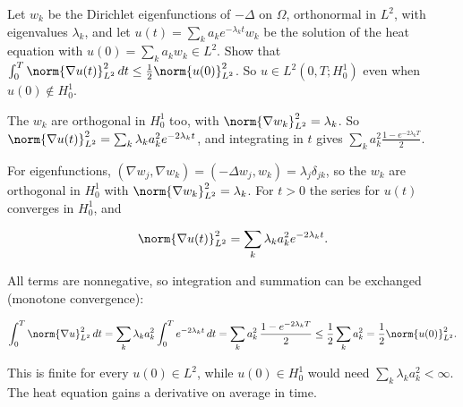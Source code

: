 \begin{exercise}
  Let $w_k$ be the Dirichlet eigenfunctions of $-\Delta$ on $\Omega$, orthonormal in $L^2$, with eigenvalues $\lambda_k$, and let $u(t) = \sum_k a_k e^{-\lambda_k t} w_k$ be the solution of the heat equation with $u(0) = \sum_k a_k w_k \in L^2$. Show that $\int_0^T \norm{\nabla u(t)}_{L^2}^2\,dt \le \frac12\norm{u(0)}_{L^2}^2$. So $u \in L^2(0,T;H^1_0)$ even when $u(0) \notin H^1_0$.
  \begin{hint}
    The $w_k$ are orthogonal in $H^1_0$ too, with $\norm{\nabla w_k}_{L^2}^2 = \lambda_k$. So $\norm{\nabla u(t)}_{L^2}^2 = \sum_k \lambda_k a_k^2 e^{-2\lambda_k t}$, and integrating in $t$ gives $\sum_k a_k^2 \frac{1 - e^{-2\lambda_k T}}{2}$.
  \end{hint}
  \begin{solution}
    For eigenfunctions, $(\nabla w_j, \nabla w_k) = (-\Delta w_j, w_k) = \lambda_j\delta_{jk}$, so the $w_k$ are orthogonal in $H^1_0$ with $\norm{\nabla w_k}_{L^2}^2 = \lambda_k$. For $t > 0$ the series for $u(t)$ converges in $H^1_0$, and

    \[ \norm{\nabla u(t)}_{L^2}^2 = \sum_k \lambda_k a_k^2 e^{-2\lambda_k t}. \]

    All terms are nonnegative, so integration and summation can be exchanged (monotone convergence):

    \[ \int_0^T \norm{\nabla u}_{L^2}^2\,dt = \sum_k \lambda_k a_k^2\int_0^T e^{-2\lambda_kt}\,dt = \sum_k a_k^2\,\frac{1 - e^{-2\lambda_kT}}{2}
             \le \frac12\sum_k a_k^2 = \frac12\norm{u(0)}_{L^2}^2. \]

    This is finite for every $u(0) \in L^2$, while $u(0) \in H^1_0$ would need $\sum_k\lambda_k a_k^2 < \infty$. The heat equation gains a derivative on average in time.
  \end{solution}
\end{exercise}

